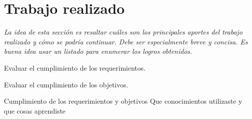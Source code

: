 
\section{Trabajo realizado}

\emph{La idea de esta sección es resaltar cuáles son los principales aportes del trabajo realizado y cómo se podría continuar. Debe ser especialmente breve y concisa. Es buena idea usar un listado para enumerar los logros obtenidos.}


Evaluar el cumplimiento de los requerimientos.

Evaluar el cumplimiento de los objetivos.

Cumplimiento de los requerimientos y objetivos
Que conocimientos utilizaste y que cosas aprendiste



%
%



